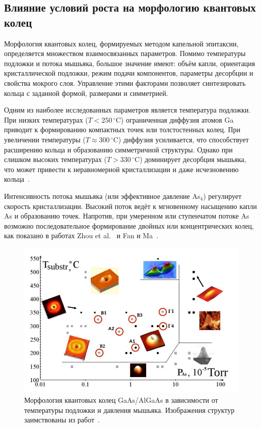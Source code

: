 \documentclass[14pt,oneside]{extarticle}
\begin{document}
\subsection{Влияние условий роста на морфологию квантовых колец}

Морфология квантовых колец, формируемых методом капельной эпитаксии, определяется множеством взаимосвязанных параметров. Помимо температуры подложки и потока мышьяка, большое значение имеют: объём капли, ориентация кристаллической подложки, режим подачи компонентов, параметры десорбции и свойства мокрого слоя. Управление этими факторами позволяет синтезировать кольца с заданной формой, размерами и симметрией.

Одним из наиболее исследованных параметров является температура подложки. При низких температурах ($T < 250\,^{\circ}\mathrm{C}$) ограниченная диффузия атомов Ga приводит к формированию компактных точек или толстостенных колец. При увеличении температуры ($T \approx 300\,^{\circ}\mathrm{C}$) диффузия усиливается, что способствует расширению кольца и образованию симметричной структуры. Однако при слишком высоких температурах ($T > 330\,^{\circ}\mathrm{C}$) доминирует десорбция мышьяка, что может привести к неравномерной кристаллизации и даже исчезновению кольца~\cite{sibirmovskiy2014,vasilevskiy2013}.

Интенсивность потока мышьяка (или эффективное давление As$_4$) регулирует скорость кристаллизации. Высокий поток ведёт к мгновенному насыщению капли As и образованию точек. Напротив, при умеренном или ступенчатом потоке As возможно последовательное формирование двойных или концентрических колец, как показано в работах Zhou et al.~\cite{zhou2013} и Fan и Ma~\cite{fan2023}.

\begin{figure}
    \begin{center}
        \includegraphics[width=14cm]{images/morphology_map.png}
        \caption{\label{fig:morph_map}
            Морфология квантовых колец GaAs/AlGaAs в зависимости от температуры подложки и давления мышьяка. Изображения структур заимствованы из работ~\cite{mano2005nano, koguchi2005growth, vasilevskiy2013}.}
    \end{center}
\end{figure}
\end{document}
